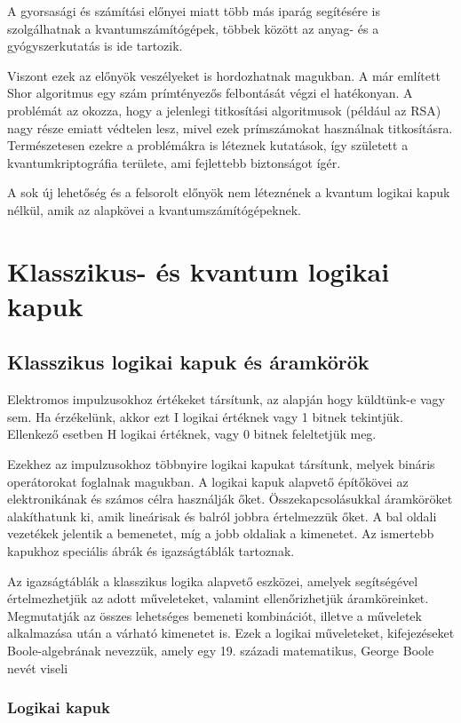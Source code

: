 \documentclass[
]{thesis-ekf}
\theoremstyle{definition}
\theoremstyle{remark}
\begin{document}
A gyorsasági és számítási előnyei miatt több más iparág segítésére is szolgálhatnak a kvantumszámítógépek, többek között az anyag- és a gyógyszerkutatás is ide tartozik.

Viszont ezek az előnyök veszélyeket is hordozhatnak magukban. A már említett Shor algoritmus egy szám prímtényezős felbontását végzi el hatékonyan. A problémát az okozza, hogy a jelenlegi titkosítási algoritmusok (például az RSA) nagy része emiatt védtelen lesz, mivel ezek prímszámokat használnak titkosításra. Természetesen ezekre a problémákra is léteznek kutatások, így született a kvantumkriptográfia területe, ami fejlettebb biztonságot ígér.

A sok új lehetőség és a felsorolt előnyök nem léteznének a kvantum logikai kapuk nélkül, amik az alapkövei a kvantumszámítógépeknek.

\chapter{Klasszikus- és kvantum logikai kapuk}
\section{Klasszikus logikai kapuk és áramkörök}
Elektromos impulzusokhoz értékeket társítunk, az alapján hogy küldtünk-e vagy sem. Ha érzékelünk, akkor ezt I logikai értéknek vagy 1 bitnek tekintjük. Ellenkező esetben H logikai értéknek, vagy 0 bitnek feleltetjük meg.

Ezekhez az impulzusokhoz többnyire logikai kapukat társítunk, melyek bináris operátorokat foglalnak magukban. A logikai kapuk alapvető építőkövei az elektronikának és számos célra használják őket. Összekapcsolásukkal áramköröket alakíthatunk ki, amik lineárisak és balról jobbra értelmezzük őket. A bal oldali vezetékek jelentik a bemenetet, míg a jobb oldaliak a kimenetet. Az ismertebb kapukhoz speciális ábrák és igazságtáblák tartoznak.

Az igazságtáblák a klasszikus logika alapvető eszközei, amelyek segítségével értelmezhetjük az adott műveleteket, valamint ellenőrizhetjük áramköreinket. Megmutatják az összes lehetséges bemeneti kombinációt, illetve a műveletek alkalmazása után a várható kimenetet is. Ezek a logikai műveleteket, kifejezéseket Boole-algebrának nevezzük, amely egy 19. századi matematikus, George Boole nevét viseli
\subsection{Logikai kapuk}
\end{document}
